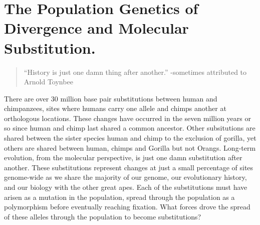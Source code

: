 
\chapter{The Population Genetics of Divergence and Molecular Substitution.}
\begin{quote}
``History is just one damn thing after another.'' -sometimes attributed to Arnold Toynbee
\end{quote} %


There are over $30$ million base pair substitutions between human and chimpanzees,
sites where humans carry one allele and chimps another at orthologous locations. These changes
have occurred in the seven million years or so since human and chimp
last shared a common ancestor. Other subsitutions are shared between
the sister species human and chimp to the exclusion of gorilla, yet
others are shared between human, chimps and Gorilla but not Orangs. Long-term evolution, from the molecular
perspective, is just one damn substitution after another.  These substitutions represent changes
at just a small percentage of sites genome-wide as we share the majority of our
genome, our evolutionary history, and our biology with the
other great apes. Each of the substitutions must have arisen as a mutation in the
population, spread through the population as a polymorphism before
eventually reaching fixation. What forces drove the spread of these
alleles through the population to become substitutions?
